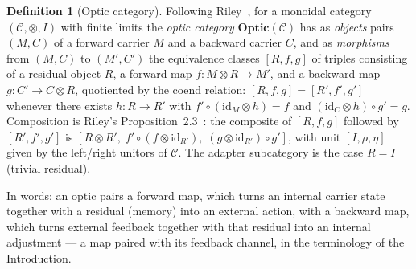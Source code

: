 \documentclass[11pt,a4paper]{article}
\theoremstyle{plain}
\theoremstyle{definition}
\newtheorem{definition}[theorem]{Definition}
\theoremstyle{remark}
\newcommand{\CC}{\mathcal{C}}
\newcommand{\Optic}{\mathbf{Optic}}
\begin{document}
\begin{definition}[Optic category]
\label{def:optic}
Following Riley~\cite{riley2018optics}, for a monoidal category
$(\CC, \otimes, I)$ with finite limits the \emph{optic category}
$\Optic(\CC)$ has as \emph{objects} pairs $(M, C)$ of a forward
carrier $M$ and a backward carrier $C$, and as \emph{morphisms} from
$(M, C)$ to $(M', C')$ the equivalence classes $[R, f, g]$ of triples
consisting of a residual object $R$, a forward map
$f : M \otimes R \to M'$, and a backward map $g : C' \to C \otimes
R$, quotiented by the coend relation: $[R, f, g] = [R', f', g']$
whenever there exists $h : R \to R'$ with
$f' \circ (\mathrm{id}_M \otimes h) = f$ and
$(\mathrm{id}_C \otimes h) \circ g' = g$. Composition is
Riley's Proposition~2.3~\cite{riley2018optics}: the composite of
$[R, f, g]$ followed by $[R', f', g']$ is
$[R \otimes R',\; f' \circ (f \otimes \mathrm{id}_{R'}),\;
(g \otimes \mathrm{id}_{R'}) \circ g']$, with unit
$[I, \rho, \eta]$ given by the left/right unitors of $\CC$. The
adapter subcategory is the case $R = I$ (trivial residual).
\end{definition}

In words: an optic pairs a forward map, which turns an internal
carrier state together with a residual (memory) into an external
action, with a backward map, which turns external feedback together
with that residual into an internal adjustment --- a map paired
with its feedback channel, in the terminology of the Introduction.
\end{document}
